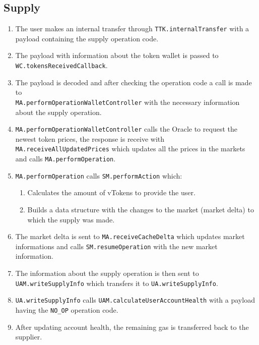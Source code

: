 \subsection{Supply}
\begin{enumerate}
  \item The user makes an internal transfer through \verb|TTK.internalTransfer| with a payload containing the supply operation code.
  \item The payload with information about the token wallet is passed to \\\verb|WC.tokensReceivedCallback|.
  \item The payload is decoded and after checking the operation code a call is made to \\\verb|MA.performOperationWalletController| with the necessary information about the supply operation.
  \item \verb|MA.performOperationWalletController| calls the Oracle to request the newest token prices, the response is receive with \verb|MA.receiveAllUpdatedPrices| which updates all the prices in the markets and calls \verb|MA.performOperation|.
  \item \verb|MA.performOperation| calls \verb|SM.performAction| which:
  \begin{enumerate}[label*=\arabic*.]
    \item Calculates the amount of vTokens to provide the user.
    \item Builds a data structure with the changes to the market (market delta) to which the supply was made.
  \end{enumerate}
  \item The market delta is sent to \verb|MA.receiveCacheDelta| which updates market informations and calls \verb|SM.resumeOperation| with the new market information.
  \item The information about the supply operation is then sent to \verb|UAM.writeSupplyInfo| which transfers it to \verb|UA.writeSupplyInfo|.
  \item \verb|UA.writeSupplyInfo| calls \verb|UAM.calculateUserAccountHealth| with a payload having the \verb|NO_OP| operation code.
  \item After updating account health, the remaining gas is transferred back to the supplier.
\end{enumerate}

